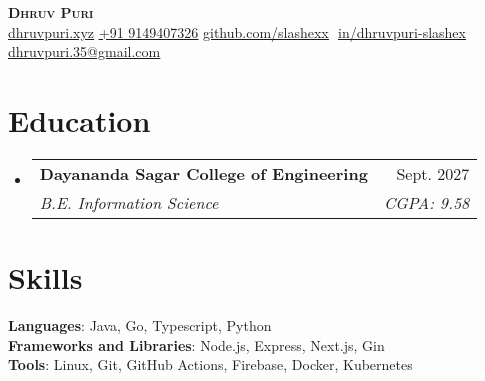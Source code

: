 \documentclass[letterpaper,11pt]{article}
\makeatletter
\newcommand{\resumeSubheading}[4]{
  \vspace{-2pt}\item
    \begin{tabular*}{0.97\textwidth}[t]{l@{\extracolsep{\fill}}r}
      \textbf{#1} & #2 \\
      \textit{\small#3} & \textit{\small #4} \\
    \end{tabular*}\vspace{-7pt}
}
\newcommand{\resumeSubHeadingListStart}{\begin{itemize}[leftmargin=0.15in, label={}]}
\newcommand{\resumeSubHeadingListEnd}{\end{itemize}}
\makeatother
\begin{document}
\begin{flushright}
  \color{gray}
  \item
\end{flushright}

\vspace{-16.5pt}

\begin{center}
    \textbf{\Huge \scshape Dhruv Puri} \\ \vspace{8pt}
    \small 
    \href{https://dhruvpuri.xyz/}
    {\underline{dhruvpuri.xyz}}
    \href{tel:+919149407326}
    {\underline{+91 9149407326}}
    \href{https://github.com/slashexx}{\underline{github.com/slashexx}} $  $
    \href{https://linkedin.com/in/dhruvpuri-slashex}{\underline{in/dhruvpuri-slashex}} $  $
    \href{mailto:dhruvpuri.35@gmail.com}
    {\underline{dhruvpuri.35@gmail.com}}
    
\end{center}

\section{Education}
  \resumeSubHeadingListStart
  
    \resumeSubheading
      {Dayananda Sagar College of Engineering}{Sept. 2027}
      {B.E. Information Science}{CGPA: 9.58}
  \resumeSubHeadingListEnd
\section{Skills}
 \begin{itemize}[leftmargin=0.15in, label={}]
    \small{\item{
    
     \textbf{Languages}{: Java, Go, Typescript, Python} \\
     \textbf{Frameworks and Libraries}{: Node.js, Express, Next.js, Gin} \\
     
     \textbf{Tools}{: Linux, Git, GitHub Actions, Firebase, Docker, Kubernetes}     
     
    }}
 \end{itemize}
 \vspace{-15pt}
 
\end{document}
